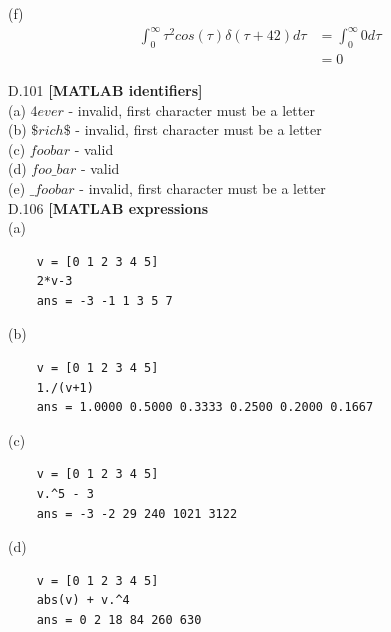 \documentclass{article}
\begin{document}
(f)
\begin{equation*}
\begin{split}
    \int_{0}^{\infty} \tau^2 cos(\tau)\delta(\tau + 42) d\tau
    &= \int_{0}^{\infty} 0d\tau\\
    &= 0
\end{split}
\end{equation*}


\bigbreak
D.101 {\bf [MATLAB identifiers]}\\
(a)
$4ever$ - invalid, first character must be a letter\\
(b)
$\$rich\$$ - invalid, first character must be a letter\\
(c)
$foobar$ - valid\\
(d)
$foo\_bar$ - valid\\
(e)
$\_foobar$ - invalid, first character must be a letter\\


\bigbreak
D.106 {\bf [MATLAB expressions}\\
(a)
\begin{lstlisting}
    v = [0 1 2 3 4 5]
    2*v-3
    ans = -3 -1 1 3 5 7
\end{lstlisting}

(b)
\begin{lstlisting}
    v = [0 1 2 3 4 5]
    1./(v+1)
    ans = 1.0000 0.5000 0.3333 0.2500 0.2000 0.1667
\end{lstlisting}

(c)
\begin{lstlisting}
    v = [0 1 2 3 4 5]
    v.^5 - 3
    ans = -3 -2 29 240 1021 3122
\end{lstlisting}

(d)
\begin{lstlisting}
    v = [0 1 2 3 4 5]
    abs(v) + v.^4
    ans = 0 2 18 84 260 630
\end{lstlisting}
\end{document}
